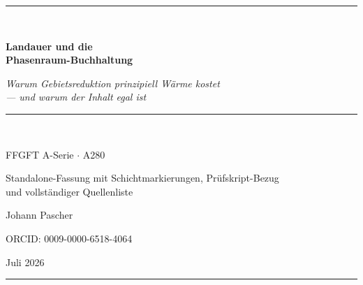 \documentclass[11pt,a4paper]{article}
\begin{document}
\begin{titlepage}
\centering
\vspace*{2.2cm}
{\color{rulecol}\rule{0.5\textwidth}{0.6pt}}\\[1.4cm]
{\color{accent}\Huge\bfseries Landauer und die\\[0.3em] Phasenraum-Buchhaltung\par}
\vspace{1.0cm}
{\large\itshape Warum Gebietsreduktion prinzipiell Wärme kostet\\ --- und warum der Inhalt egal ist\par}
\vspace{0.6cm}
{\color{accent2}\rule{0.28\textwidth}{0.4pt}}\\[1.0cm]
{\large FFGFT A-Serie $\cdot$ A280\par}
\vspace{0.5cm}
{\normalsize Standalone-Fassung mit Schichtmarkierungen, Prüfskript-Bezug\\ und vollständiger Quellenliste\par}
\vfill
{\large Johann Pascher\par}
\vspace{0.3cm}
{\footnotesize ORCID: 0009-0000-6518-4064\par}
\vspace{0.2cm}
{\footnotesize Juli 2026\par}
\vspace{1.4cm}
{\color{rulecol}\rule{0.5\textwidth}{0.6pt}}
\vspace*{1.5cm}
\end{titlepage}

\tableofcontents
\thispagestyle{fancy}
\clearpage
\end{document}
